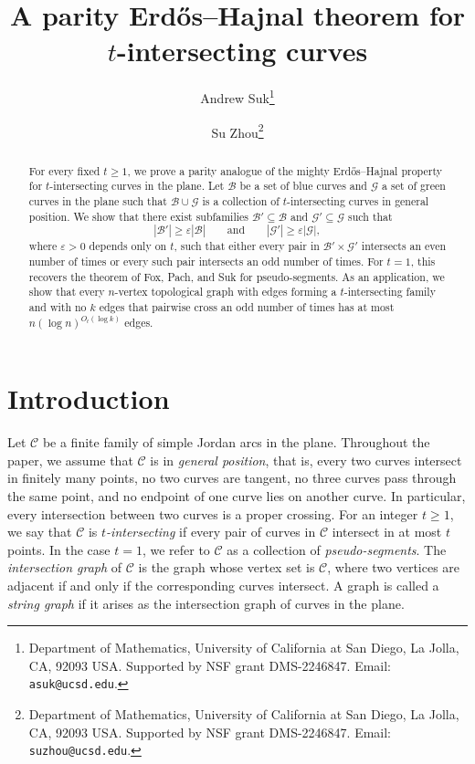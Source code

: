 \documentclass[11pt]{article}
\date{}
\title{A parity Erd\H{o}s--Hajnal theorem for \(t\)-intersecting curves}
\theoremstyle{plain}
\theoremstyle{definition}
\theoremstyle{remark}
\begin{document}
\author{Andrew Suk\thanks{Department of Mathematics, University of California at San Diego, La Jolla, CA, 92093 USA. Supported by NSF grant DMS-2246847. Email: {\tt asuk@ucsd.edu}.}  \and Su Zhou\thanks{Department of Mathematics, University of California at San Diego, La Jolla, CA, 92093 USA. Supported by NSF grant DMS-2246847. Email: {\tt suzhou@ucsd.edu}.} }


\maketitle




 
\begin{abstract}
For every fixed \(t\ge 1\), we prove a parity analogue of the mighty
Erd\H{o}s--Hajnal property for \(t\)-intersecting curves in the plane. Let
\(\mathcal B\) be a set of blue curves and \(\mathcal G\) a set of green
curves in the plane such that \(\mathcal B\cup\mathcal G\) is a collection
of \(t\)-intersecting curves in general position. We show that there exist
subfamilies \(\mathcal B'\subseteq\mathcal B\) and
\(\mathcal G'\subseteq\mathcal G\) such that
\[
|\mathcal B'|\geq \varepsilon|\mathcal B|
\qquad\text{and}\qquad
|\mathcal G'|\geq \varepsilon|\mathcal G|,
\]
where \(\varepsilon>0\) depends only on \(t\), such that either every pair in
\(\mathcal B'\times\mathcal G'\) intersects an even number of times or every
such pair intersects an odd number of times. For \(t=1\), this recovers the
theorem of Fox, Pach, and Suk for pseudo-segments. As an application, we show
that every \(n\)-vertex topological graph with edges forming a
\(t\)-intersecting family and with no \(k\) edges that pairwise cross an odd
number of times has at most \(n(\log n)^{O_t(\log k)}\) edges.
\end{abstract}
 







\section{Introduction}


Let \(\mathcal{C}\) be a finite family of simple Jordan arcs in the plane.
Throughout the paper, we assume that \(\mathcal{C}\) is in \emph{general
position}, that is, every two curves intersect in finitely many points, no two
curves are tangent, no three curves pass through the same point, and no
endpoint of one curve lies on another curve. In particular, every intersection
between two curves is a proper crossing. For an integer \(t\ge 1\), we say
that \(\mathcal{C}\) is \emph{\(t\)-intersecting} if every pair of curves in
\(\mathcal{C}\) intersect in at most \(t\) points. In the case \(t=1\), we
refer to \(\mathcal{C}\) as a collection of \emph{pseudo-segments}. The
\emph{intersection graph} of \(\mathcal C\) is the graph whose vertex set is
\(\mathcal C\), where two vertices are adjacent if and only if the
corresponding curves intersect. A graph is called a \emph{string graph} if it
arises as the intersection graph of curves in the plane.
\end{document}
